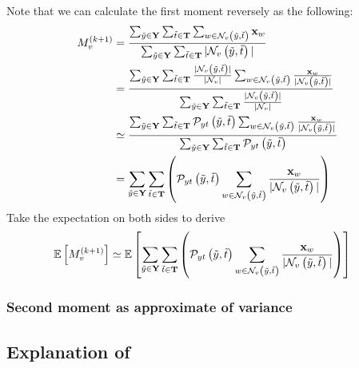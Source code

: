 Note that we can calculate the first moment reversely as the following:
\begin{align}
    M_{ v}^{(k+1)} &= {\sum_{\tilde{y}\in \bold{Y}}\sum_{\tilde{t}\in\bold{T}}\sum_{w\in\mathcal{N}_{v}\left(\tilde{y}, \tilde{t}\right)}\bold{x}_w \over \sum_{\tilde{y}\in \bold{Y}}\sum_{\tilde{t}\in\bold{T}} |\mathcal{N}_{v}\left(\tilde{y}, \tilde{t}\right)|} \\&=   {\sum_{\tilde{y}\in\bold{Y}}\sum_{\tilde{t}\in\bold{T}}{|\mathcal{N}_{v}\left(\tilde{y}, \tilde{t}\right)| \over |\mathcal{N}_{v}|}\sum_{w\in\mathcal{N}_{v}\left(\tilde{y}, \tilde{t}\right)}{\bold{x}_w \over |\mathcal{N}_{v}\left(\tilde{y}, \tilde{t}\right)|} \over \sum_{\tilde{y}\in \bold{Y}}\sum_{\tilde{t}\in\bold{T}} {|\mathcal{N}_{v}\left(\tilde{y}, \tilde{t}\right)| \over |\mathcal{N}_{v}|}} \\&\simeq
    {\sum_{\tilde{y}\in\bold{Y}}\sum_{\tilde{t}\in\bold{T}}{\mathcal{P}_{y t}\left(\tilde{y}, \tilde{t}\right)}\sum_{w\in\mathcal{N}_{v}\left(\tilde{y}, \tilde{t}\right)}{\bold{x}_w \over |\mathcal{N}_{v}\left(\tilde{y}, \tilde{t}\right)|} \over \sum_{\tilde{y}\in \bold{Y}}\sum_{\tilde{t}\in\bold{T}} {\mathcal{P}_{y t}\left(\tilde{y}, \tilde{t}\right)}} \\&=
    \sum_{\tilde{y}\in\bold{Y}}\sum_{\tilde{t}\in\bold{T}}\left({\mathcal{P}_{y t}\left(\tilde{y}, \tilde{t}\right)}\sum_{w\in\mathcal{N}_{v}\left(\tilde{y}, \tilde{t}\right)}{\bold{x}_w \over |\mathcal{N}_{v}\left(\tilde{y}, \tilde{t}\right)|}\right)
\end{align}
Take the expectation on both sides to derive
\begin{align}
    \mathbb{E}\left[M_{ v}^{(k+1)}\right] &\simeq
    \mathbb{E}\left[\sum_{\tilde{y}\in\bold{Y}}\sum_{\tilde{t}\in\bold{T}}\left({\mathcal{P}_{y t}\left(\tilde{y}, \tilde{t}\right)}\sum_{w\in\mathcal{N}_{v}\left(\tilde{y}, \tilde{t}\right)}{\bold{x}_w \over |\mathcal{N}_{v}\left(\tilde{y}, \tilde{t}\right)|}\right)\right]
\end{align}

\subsubsection{Second moment as approximate of variance}




\subsection{Explanation of \PMP}
\label{apdx:PMP}

